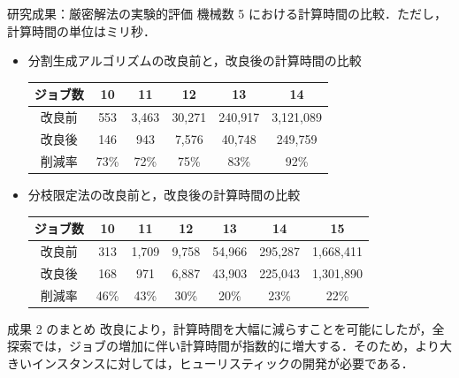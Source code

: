 \documentclass[dvipdfmx]{beamer}
\begin{document}
    \begin{frame}{研究成果：厳密解法の実験的評価}
      機械数 5 における計算時間の比較．ただし，計算時間の単位はミリ秒．
      \begin{itemize}
        \item 分割生成アルゴリズムの改良前と，改良後の計算時間の比較
        \begin{tabular}{|c|c|c|c|c|c|} \hline
          ジョブ数 & 10 & 11 & 12 & 13 & 14 \\ \hline \hline
          改良前 & 553 & 3,463 & 30,271 & 240,917 & 3,121,089 \\ \hline
          改良後 & 146 & 943 & 7,576 & 40,748 & 249,759  \\ \hline
          削減率 & 73\% & 72\% & 75\% & 83\% & \alert{92\%} \\ \hline
        \end{tabular}
        \item 分枝限定法の改良前と，改良後の計算時間の比較
        \begin{tabular}{|c|c|c|c|c|c|c|} \hline
          ジョブ数 & 10 & 11 & 12 & 13 & 14 & 15\\ \hline \hline
          改良前 & 313 & 1,709 & 9,758 & 54,966 & 295,287 & 1,668,411 \\ \hline
          改良後 & 168 & 971 & 6,887 & 43,903 & 225,043 & 1,301,890 \\ \hline
          削減率 & 46\% & 43\% & 30\% & 20\% & 23\% & \alert{22\%} \\ \hline
        \end{tabular}
      \end{itemize}
      \begin{alertblock}{成果 2 のまとめ}
        改良により，計算時間を大幅に減らすことを可能にしたが，全探索では，ジョブの増加に伴い計算時間が指数的に増大する．そのため，より大きいインスタンスに対しては，ヒューリスティックの開発が必要である．
      \end{alertblock}
    \end{frame}
\end{document}
